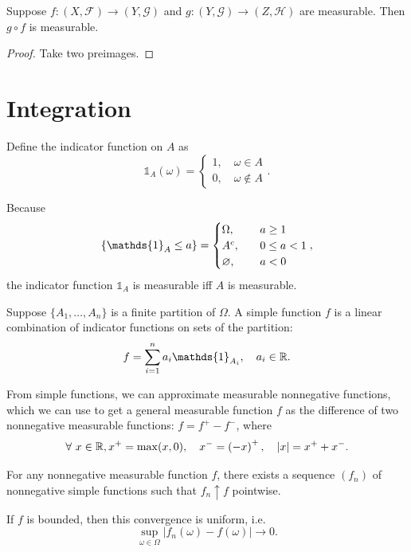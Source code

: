 \begin{lemma}
	Suppose $f: (X, \mathscr{F}) \to \left( Y , \mathscr{G} \right)$ and $g: \left( Y, \mathscr{G} \right) \to \left( Z, \mathscr{H} \right)$ are measurable. Then $g\circ f$ is measurable.
\end{lemma}

\begin{proof}
	Take two preimages.
\end{proof}

\section{Integration}


\begin{definition}
	Define the indicator function on $A$ as \[
		\mathds{1}_{A}(\omega) = \begin{cases}
			1, \quad \omega \in A \\
			0, \quad \omega \not\in A
		\end{cases}
	.\] 

	Because \[
		\{\mathds{1}_{A} \le a\} = \begin{cases}
			\Omega, \quad &a \ge 1 \\
			A^{c}, \quad & 0 \le a < 1 \\
			\O, \quad &a < 0
		\end{cases}
	,\] the indicator function $\mathds{1}_{A}$ is measurable iff $A$ is measurable.
\end{definition}

\begin{definition}
	Suppose $\{A_1,\ldots,A_n\}$ is a finite partition of $\Omega$. A simple function $f$ is a linear combination of indicator functions on sets of the partition: \[
		f = \sum\limits_{i=1}^{n} a_i \mathds{1}_{A_i}, \quad a_i \in \R
	.\] 
\end{definition}

From simple functions, we can approximate measurable nonnegative functions, which we can use to get a general measurable function $f$ as the difference of two nonnegative measurable functions: $f = f^+ - f^-$, where \[
	\forall\ x \in \mathbb{R}, x^+ = \max(x,0), \quad x^- = \left( -x \right)^+, \quad \left| x \right| = x^+ + x^-
.\] 

\begin{lemma}
	For any nonnegative measurable function $f$, there exists a sequence $(f_n)$ of nonnegative simple functions such that $f_n \uparrow f$ pointwise.

	If $f$ is bounded, then this convergence is uniform, i.e. \[
		\sup_{\omega \in \Omega} \left| f_n(\omega) - f(\omega) \right| \to 0
	.\]
\end{lemma}

